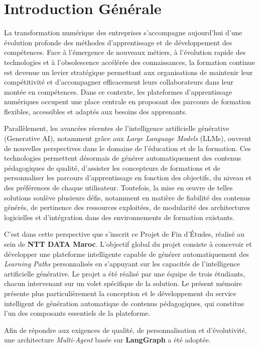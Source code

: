 \documentclass[12pt,a4paper,oneside]{report}
\begin{document}
\chapter*{Introduction Générale}

La transformation numérique des entreprises s'accompagne aujourd'hui d'une évolution profonde des méthodes d'apprentissage et de développement des compétences. Face à l'émergence de nouveaux métiers, à l'évolution rapide des technologies et à l'obsolescence accélérée des connaissances, la formation continue est devenue un levier stratégique permettant aux organisations de maintenir leur compétitivité et d'accompagner efficacement leurs collaborateurs dans leur montée en compétences. Dans ce contexte, les plateformes d'apprentissage numériques occupent une place centrale en proposant des parcours de formation flexibles, accessibles et adaptés aux besoins des apprenants.

Parallèlement, les avancées récentes de l'intelligence artificielle générative (Generative AI), notamment grâce aux \textit{Large Language Models} (LLMs), ouvrent de nouvelles perspectives dans le domaine de l'éducation et de la formation. Ces technologies permettent désormais de générer automatiquement des contenus pédagogiques de qualité, d'assister les concepteurs de formations et de personnaliser les parcours d'apprentissage en fonction des objectifs, du niveau et des préférences de chaque utilisateur. Toutefois, la mise en œuvre de telles solutions soulève plusieurs défis, notamment en matière de fiabilité des contenus générés, de pertinence des ressources exploitées, de modularité des architectures logicielles et d'intégration dans des environnements de formation existants.

C'est dans cette perspective que s'inscrit ce Projet de Fin d'Études, réalisé au sein de \textbf{NTT DATA Maroc}. L'objectif global du projet consiste à concevoir et développer une plateforme intelligente capable de générer automatiquement des \textit{Learning Paths} personnalisés en s'appuyant sur les capacités de l'intelligence artificielle générative. Le projet a été réalisé par une équipe de trois étudiants, chacun intervenant sur un volet spécifique de la solution. Le présent mémoire présente plus particulièrement la conception et le développement du service intelligent de génération automatique de contenus pédagogiques, qui constitue l'un des composants essentiels de la plateforme.

Afin de répondre aux exigences de qualité, de personnalisation et d'évolutivité, une architecture \textit{Multi-Agent} basée sur \textbf{LangGraph} a été adoptée. 
\end{document}
